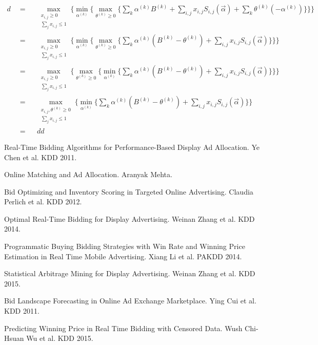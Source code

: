\documentclass{article}
\theoremstyle{definition}
\newcommand{\sumj}{\sum\limits_j}
\newcommand{\sumk}{\sum\limits_k}
\newcommand{\sumij}{\sum\limits_{i,j}}
\newcommand{\sx}{x_{i,j}}
\newcommand{\sB}{B^{(k)}}
\newcommand{\salpha}{\alpha^{(k)}}
\newcommand{\stheta}{\theta^{(k)}}
\newcommand{\sS}{S_{i,j}}
\newcommand{\valpha}{\vec{\alpha}}
\newcommand{\assignmentconstraint}{\sumj \sx \le 1}
\begin{document}
\begin{CJK}{UTF8}{gbsn}
\begin{align*}
    d     & = &&
        \max\limits_{\substack{ \sx \ge 0 \\ \assignmentconstraint }} \{
        \min\limits_{\salpha} \{ \max\limits_{\stheta \ge 0} \{
        \sumk \salpha \sB + \sumij \sx \sS(\valpha) + \sumk \stheta (-\salpha)\} \} \}\\
    \quad & = &&
        \max\limits_{\substack{ \sx \ge 0 \\ \assignmentconstraint }} \{
        \min\limits_{\salpha} \{ \max\limits_{\stheta \ge 0} \{
        \sumk \salpha (\sB - \stheta) + \sumij \sx \sS(\valpha) \} \} \}\\
    \quad & = &&
        \max\limits_{\substack{ \sx \ge 0 \\ \assignmentconstraint }} \{
        \max\limits_{\stheta \ge 0} \{ \min\limits_{\salpha} \{
        \sumk \salpha (\sB - \stheta) + \sumij \sx \sS(\valpha) \} \} \}\\
    \quad & = &&
        \max\limits_{\substack{ \sx,\stheta \ge 0 \\ \assignmentconstraint }} \{
        \min\limits_{\salpha} \{
        \sumk \salpha (\sB - \stheta) + \sumij \sx \sS(\valpha) \} \}\\
    \quad & = && dd
\end{align*}

\begin{thebibliography}{9}
Real-Time Bidding Algorithms for Performance-Based Display Ad Allocation. Ye Chen et al. KDD 2011.

Online Matching and Ad Allocation. Aranyak Mehta.

Bid Optimizing and Inventory Scoring in Targeted Online Advertising. Claudia Perlich et al. KDD 2012.
  
Optimal Real-Time Bidding for Display Advertising. Weinan Zhang et al. KDD 2014.

Programmatic Buying Bidding Strategies with Win Rate and Winning Price Estimation in Real Time Mobile Advertising. Xiang Li et al. PAKDD 2014.

Statistical Arbitrage Mining for Display Advertising. Weinan Zhang et al. KDD 2015.

Bid Landscape Forecasting in Online Ad Exchange Marketplace. Ying Cui et al. KDD 2011.

Predicting Winning Price in Real Time Bidding with Censored Data. Wush Chi-Hsuan Wu et al. KDD 2015.
\end{thebibliography}

\end{CJK}
\end{document}
